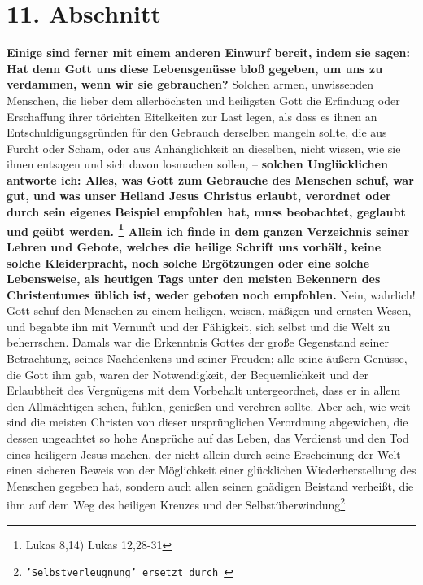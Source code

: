 {\section{11. Abschnitt} \label{kap17_ab11}

\label{ref:17_11_einwand_2} \textbf{Einige sind ferner mit einem anderen
Einwurf
bereit, indem sie sagen:
Hat denn
Gott uns diese Lebensgenüsse bloß gegeben, um uns zu verdammen, wenn wir sie
gebrauchen?} Solchen armen, unwissenden Menschen, die lieber dem allerhöchsten
und heiligsten Gott die Erfindung oder Erschaffung ihrer törichten Eitelkeiten
zur Last legen, als dass es ihnen an Entschuldigungsgründen für den Gebrauch
derselben mangeln sollte, die aus Furcht oder Scham, oder aus Anhänglichkeit an
dieselben, nicht wissen, wie sie ihnen entsagen und sich davon losmachen sollen,
-- \label{ref:17_11_beteubung}\textbf{solchen Unglücklichen antworte ich: Alles,
was Gott zum Gebrauche
des
Menschen schuf, war gut, und was unser Heiland Jesus Christus erlaubt,
verordnet oder durch sein eigenes Beispiel empfohlen hat, muss beobachtet,
geglaubt und geübt werden. \footnote{Lukas 8,14)
Lukas 12,28-31}
Allein ich
finde in dem ganzen Verzeichnis seiner Lehren und Gebote, welches die heilige
Schrift uns vorhält, keine solche Kleiderpracht, noch solche Ergötzungen oder
eine solche Lebensweise, als heutigen Tags unter den meisten Bekennern des
Christentumes üblich ist, weder geboten noch empfohlen.} Nein, wahrlich! Gott
schuf den Menschen zu einem heiligen, weisen, mäßigen und ernsten Wesen, und
begabte ihn mit Vernunft und der Fähigkeit, sich selbst und die Welt zu
beherrschen.
Damals war die Erkenntnis Gottes der große Gegenstand seiner Betrachtung, seines
Nachdenkens und seiner Freuden; alle seine äußern Genüsse, die Gott ihm gab,
waren der Notwendigkeit, der Bequemlichkeit und der Erlaubtheit des Vergnügens
mit dem Vorbehalt untergeordnet, dass er in allem den Allmächtigen sehen,
fühlen, genießen und verehren sollte. Aber ach, wie weit sind die meisten
Christen von dieser ursprünglichen Verordnung abgewichen, die dessen ungeachtet
so hohe Ansprüche auf das Leben, das Verdienst und den Tod eines heiligern Jesus
machen, der nicht allein durch seine Erscheinung der Welt einen sicheren Beweis
von der Möglichkeit einer glücklichen Wiederherstellung des Menschen gegeben
hat, sondern auch allen seinen gnädigen Beistand verheißt, die ihm auf dem Weg
des heiligen Kreuzes und der
Selbstüberwindung\footnote{\texttt{'Selbstverleugnung' ersetzt durch
}}}
